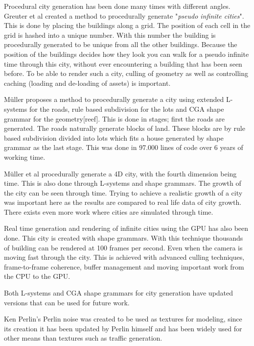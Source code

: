 Procedural city generation has been done many times with different angles. Greuter et al\cite{PseudoInfiniteCities} created a method to procedurally generate "\textit{pseudo infinite cities}". This is done by placing the buildings along a grid. The position of each cell in the grid is hashed into a unique number. With this number the building is procedurally generated to be unique from all the other buildings. Because the position of the buildings decides how they look you can walk for a pseudo infinite time through this city, without ever encountering a building that has been seen before. To be able to render such a city, culling of geometry as well as controlling caching (loading and de-loading of assets) is important\cite{PseudoInfiniteCities}.

\par 
M\"uller proposes a method to procedurally generate a city using extended L-systems for the roads, rule based subdivision for the lots and CGA shape grammar for the geometry[reef]. This is done in stages; first the roads are generated. The roads naturally generate blocks of land. These blocks are by rule based subdivision divided into lots which fits a house generated by shape grammar as the last stage. This was done in 97.000 lines of code over 6 years of working time\cite{ProceduralModeling}\cite{ProceduralModeling6}.

\par
M\"uller et al procedurally generate a 4D city, with the fourth dimension being time. This is also done through L-systems and shape grammars. The growth of the city can be seen through time. Trying to achieve a realistic growth of a city was important here as the results are compared to real life data of city growth. \cite{4DCities} There exists even more work where cities are simulated through time\cite{AutonomousTimeVarying}.


\par
Real time generation and rendering of infinite cities using the GPU has also been done\cite{InfiniteCities}. This city is created with shape grammars. With this technique thousands of building can be rendered at 100 frames per second. Even when the camera is moving fast through the city. This is achieved with advanced culling techniques, frame-to-frame coherence, buffer management and moving important work from the CPU to the GPU.

\par
Both L-systems and CGA shape grammars for city generation have updated versions that can be used for future work\cite{InteractiveProceduralStreet}\cite{AdvancedProceduralModel}.

\par
Ken Perlin's Perlin noise was created to be used as textures for modeling, since its creation it has been updated by Perlin himself and has been widely used for other means than textures such as traffic generation\cite{PerlinNoise}\cite{TrafficGenerator}.